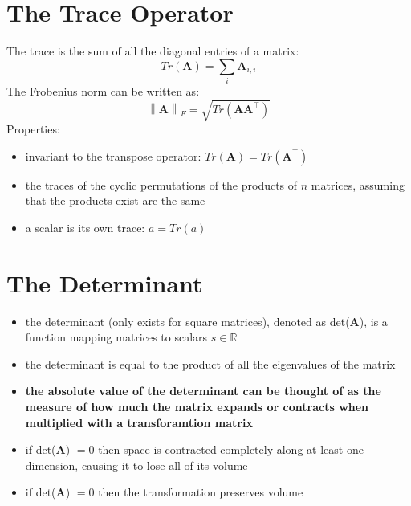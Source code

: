\documentclass[11pt,twocolumn]{report}
\def\realnumbers{\mathbb{R}}
\newcommand{\norm}[1]{\left\lVert#1\right\rVert}
\begin{document}
\section{The Trace Operator}
The trace is the sum of all the diagonal entries of a matrix:
\begin{equation}
  Tr(\bm{A}) = \sum_i \bm{A}_{i, i}
\end{equation}
The Frobenius norm can be written as:
\begin{equation}
  \norm{\bm{A}}_F = \sqrt{Tr(\bm{AA}^\intercal)}
\end{equation}
Properties:
\begin{itemize}
  \item invariant to the transpose operator: $Tr(\bm{A}) = Tr(\bm{A}^\intercal)$
  \item the traces of the cyclic permutations of the products of $n$ matrices,
    assuming that the products exist are the same
  \item a scalar is its own trace: $a = Tr(a)$
\end{itemize}

\section{The Determinant}
\begin{itemize}
  \item the determinant (only exists for square matrices), denoted as
    det($\bm{A}$), is a function mapping matrices to scalars $s \in
    \realnumbers$
  \item the determinant is equal to the product of all the eigenvalues of the
    matrix
  \item \textbf{the absolute value of the determinant can be thought of as the measure
    of how much the matrix expands or contracts when multiplied with a
    transforamtion matrix}
  \item if det($\bm{A}$) $= 0$ then space is contracted completely along at
    least one dimension, causing it to lose all of its volume
  \item if det($\bm{A}$) $= 0$ then the transformation preserves volume
\end{itemize}
\end{document}
